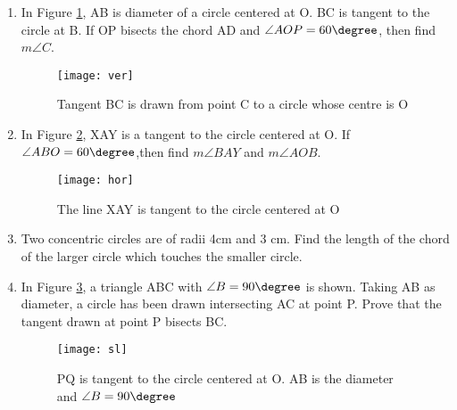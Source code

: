 \begin{enumerate}
	\item In Figure \ref{fig:ver1}, AB is diameter of a circle centered at O. BC is tangent to the circle at B. If OP bisects the chord AD and $\angle AOP=60\degree$, then find $m\angle C$.
		\begin{figure}[H]
			\centering
			\texttt{[image: ver]}
			\caption{Tangent BC is drawn from point C to a circle whose centre is O}
			\label{fig:ver1}
		\end{figure}

	\item In Figure \ref{fig:hor1}, XAY is a tangent to the circle centered at O. If $\angle ABO=60\degree$,then find $m\angle BAY$ and $m\angle AOB$.
		\begin{figure}
			\centering
			\texttt{[image: hor]}
			\caption{The line XAY is tangent to the circle centered at O}
			\label{fig:hor1}
		\end{figure}

	\item Two concentric circles are of radii 4cm and 3 cm. Find the length of the chord of the larger circle which touches the smaller circle.

	\item In Figure \ref{fig:sl1}, a triangle ABC with $\angle B=90\degree$ is shown. Taking AB as diameter, a circle has been drawn intersecting AC at point P. Prove that the tangent drawn at point P bisects BC.
		\begin{figure}[H]
			\centering
			\texttt{[image: sl]}
			\caption{PQ is tangent to the circle centered at O. AB is the diameter and $\angle B=90\degree$}
			\label{fig:sl1}
		\end{figure}
\end{enumerate}
